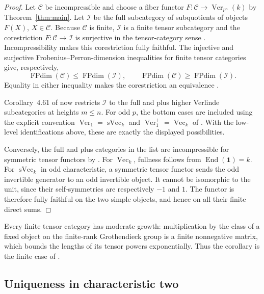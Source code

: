 \begin{proof}
Let $\mathcal C$ be incompressible and choose a fiber functor
$F:\mathcal C\to\operatorname{Ver}_{p^n}(k)$ by
Theorem~\ref{thm:main}. Let $\mathcal I$ be the full subcategory of
subquotients of objects $F(X)$, $X\in\mathcal C$. Because $\mathcal C$ is
finite, $\mathcal I$ is a finite tensor subcategory and the corestriction
$F:\mathcal C\to\mathcal I$ is surjective in the tensor-category sense
\cite[Definition~1.8.18, Proposition~1.8.19, and Section~6.3]{EGNO2015}.
Incompressibility makes this corestriction fully faithful. The injective
and surjective Frobenius--Perron-dimension inequalities for finite tensor
categories give, respectively,
\[
 \operatorname{FPdim}(\mathcal C)\leq\operatorname{FPdim}(\mathcal I),
 \qquad
 \operatorname{FPdim}(\mathcal C)\geq\operatorname{FPdim}(\mathcal I).
\]
Equality in either inequality makes the corestriction an equivalence
\cite[Propositions~6.3.3 and~6.3.4]{EGNO2015}.

Corollary~4.61 of \cite{BEO2023} now restricts $\mathcal I$ to the full
and plus higher Verlinde subcategories at heights $m\le n$. For odd $p$,
the bottom cases are included using the explicit convention
$\operatorname{Ver}_1=\operatorname{sVec}_k$ and
$\operatorname{Ver}_1^+=\operatorname{Vec}_k$ of
\cite[Section~1.3]{CoulembierEtingofOstrikIncompressible}. With the low-level
identifications above, these are exactly the displayed possibilities.

Conversely, the full and plus categories in the list are incompressible
for symmetric tensor functors by \cite[Theorem~4.71 and
Remark~4.72(iii)]{BEO2023}. For $\operatorname{Vec}_k$, fullness follows
from $\operatorname{End}(\mathbf1)=k$. For
$\operatorname{sVec}_k$ in odd characteristic, a symmetric tensor functor
sends the odd invertible generator to an odd invertible object. It cannot
be isomorphic to the unit, since their self-symmetries are respectively
$-1$ and $1$. The functor is therefore fully faithful on the two simple
objects, and hence on all their finite direct sums.
\end{proof}

Every finite tensor category has moderate growth: multiplication by the
class of a fixed object on the finite-rank Grothendieck group is a finite
nonnegative matrix, which bounds the lengths of its tensor powers
exponentially. Thus the corollary is the finite case of
\cite[Conjecture~B]{CoulembierEtingofOstrikIncompressible}.

\subsection{Uniqueness in characteristic two}

